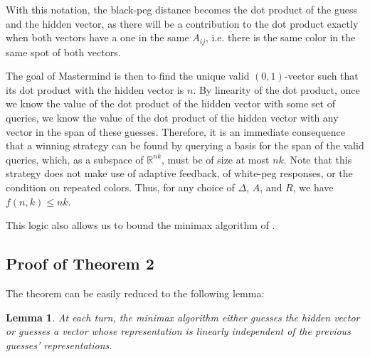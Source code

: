 \documentclass[12pt, a4paper]{article}
\newcommand{\R}{\mathbb{R}}           %
\newtheorem{lemma}{Lemma}
\begin{document}
With this notation, the black-peg distance becomes the dot product of the guess and the hidden vector, as there will be a contribution to the dot product exactly when both vectors have a one in the same $A_{ij}$, i.e. there is the same color in the same spot of both vectors. 

The goal of Mastermind is then to find the unique valid $(0,1)$-vector such that its dot product with the hidden vector is $n$. By linearity of the dot product, once we know the value of the dot product of the hidden vector with some set of queries, we know the value of the dot product of the hidden vector with any vector in the span of these guesses. Therefore, it is an immediate consequence that a winning strategy can be found by querying a basis for the span of the valid queries, which, as a subspace of $\R^{nk}$, must be of size at most $nk$. Note that this strategy does not make use of adaptive feedback, of white-peg responses, or the condition on repeated colors. Thus, for any choice of $\Delta$, $A$, and $R$, we have $f(n,k) \leq nk$.

This logic also allows us to bound the minimax algorithm of \cite{DK76}. 
\subsection{Proof of Theorem 2}
The theorem can be easily reduced to the following lemma:
\begin{lemma}
	At each turn, the minimax algorithm either guesses the hidden vector or guesses a vector whose representation is linearly independent of the previous guesses' representations.
\end{lemma}
\end{document}
